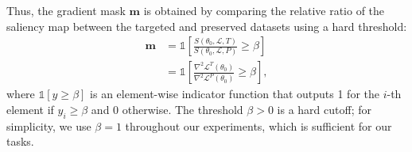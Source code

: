 Thus, the gradient mask $\mathbf{m}$ is obtained by comparing the relative ratio of the saliency map between the targeted and preserved datasets using a hard threshold:
\begin{equation}\label{eq:mask}
\begin{split}
\mathbf{m} &= \mathds{1}\left[\frac{S(\theta_0, \mathcal{L}, T)}{S(\theta_0, \mathcal{L}, P)} \geq \beta \right]\\
&= \mathds{1}\left[\frac{\nabla^2\mathcal{L}^T(\theta_0)}{\nabla^2\mathcal{L}^P(\theta_0)} \geq \beta \right],
\end{split}
\end{equation}
where $\mathds{1}[y \geq \beta]$ is an element-wise indicator function that outputs 1 for the $i$-th element if $y_i \geq \beta$ and 0 otherwise. The threshold $\beta > 0$ is a hard cutoff; for simplicity, we use $\beta=1$ throughout our experiments, which is sufficient for our tasks.
